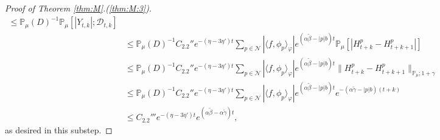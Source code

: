 \documentclass[12pt,a4paper]{amsart}
\theoremstyle{plain}
\theoremstyle{definition}
\numberwithin{equation}{section}
\begin{document}
\begin{proof}[Proof of Theorem \ref{thm:M}.(\ref{thm:M:3})]
\begin{align}
  \leq \mathbb P_\mu(D)^{-1}\mathbb P_\mu[ |Y_{t,k}| ;\mathcal D_{t,k} ]
  \\ & \leq \mathbb P_{\mu}(D)^{-1} C_{2.2}'' e^{- (\eta - 3\eta') t}\sum_{p\in \mathcal {N}} |\langle f,\phi_p\rangle_\varphi|  e^{(\alpha \tilde \beta  -|p|b)t} \mathbb P_\mu[| H_{t+k}^p-H_{t+k+1}^p |]
  \\ & \leq \mathbb P_{\mu}(D)^{-1} C_{2.2}'' e^{- (\eta - 3\eta') t}\sum_{p\in \mathcal {N}} |\langle f,\phi_p\rangle_\varphi|  e^{(\alpha \tilde \beta  -|p|b)t} \| H_{t+k}^p-H_{t+k+1}^p \|_{\mathbb P_\mu; 1+\gamma}
  \\&\leq  \mathbb P_{\mu}(D)^{-1} C_{2.2}'' e^{- (\eta - 3\eta') t}\sum_{p\in \mathcal N} |\langle f,\phi_p\rangle_\varphi|  e^{(\alpha \tilde \beta  -|p|b)t} e^{-(\alpha \tilde \gamma - |p|b)(t+k)} \\
  &  \leq  C_{2.2}''' e^{- (\eta - 3\eta') t} e^{(\alpha \tilde \beta - \alpha \tilde \gamma)t},
\end{align}
as desired in this substep.


\end{proof}
\end{document}
